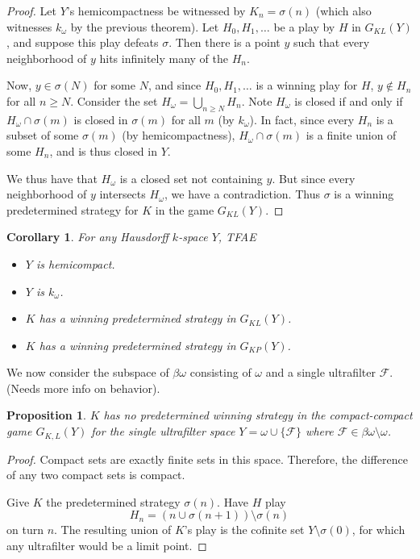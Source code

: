 \documentclass[11pt]{article}
\theoremstyle{plain}
\newtheorem{corollary}[theorem]{Corollary}
\newtheorem{proposition}[theorem]{Proposition}
\theoremstyle{definition}
\theoremstyle{remark}
\begin{document}
\begin{proof}
Let $Y$'s hemicompactness be witnessed by $K_n=\sigma(n)$ (which also witnesses $k_\omega$ by the previous theorem). Let $H_0,H_1,\dots$ be a play by $H$ in $G_{KL}(Y)$, and suppose this play defeats $\sigma$. Then there is a point $y$ such that every neighborhood of $y$ hits infinitely many of the $H_n$.

Now, $y\in\sigma(N)$ for some $N$, and since $H_0,H_1,\dots$ is a winning play for $H$, $y\not\in H_n$ for all $n\geq N$. Consider the set $H_\omega=\bigcup_{n\geq N} H_n$. Note $H_\omega$ is closed if and only if $H_\omega \cap \sigma(m)$ is closed in $\sigma(m)$ for all $m$ (by $k_\omega$). In fact, since every $H_n$ is a subset of some $\sigma(m)$ (by hemicompactness), $H_\omega \cap \sigma(m)$ is a finite union of some $H_n$, and is thus closed in $Y$.

We thus have that $H_\omega$ is a closed set not containing $y$. But since every neighborhood of $y$ intersects $H_\omega$, we have a contradiction. Thus $\sigma$ is a winning predetermined strategy for $K$ in the game $G_{KL}(Y)$.
\end{proof}

\begin{corollary}
For any Hausdorff $k$-space $Y$, TFAE
  \begin{itemize}
  \item $Y$ is hemicompact.
  \item $Y$ is $k_{\omega}$.
  \item $K$ has a winning predetermined strategy in $G_{KL}(Y)$.
  \item $K$ has a winning predetermined strategy in $G_{KP}(Y)$.
  \end{itemize}
\end{corollary}

We now consider the subspace of $\beta\omega$ consisting of $\omega$ and a single ultrafilter $\mathcal{F}$. (Needs more info on behavior).

\begin{proposition}
$K$ has no predetermined winning strategy in the compact-compact game $G_{K,L}(Y)$ for the single ultrafilter space $Y=\omega \cup \{\mathcal{F}\}$ where $\mathcal{F}\in \beta\omega\setminus\omega$.
\end{proposition}

\begin{proof}
Compact sets are exactly finite sets in this space. Therefore, the difference of any two compact sets is compact.

Give $K$ the predetermined strategy $\sigma(n)$. Have $H$ play \[H_n=(n\cup\sigma(n+1))\setminus\sigma(n)\] on turn $n$. The resulting union of $K$'s play is the cofinite set $Y\setminus\sigma(0)$, for which any ultrafilter would be a limit point.
\end{proof}
\end{document}
